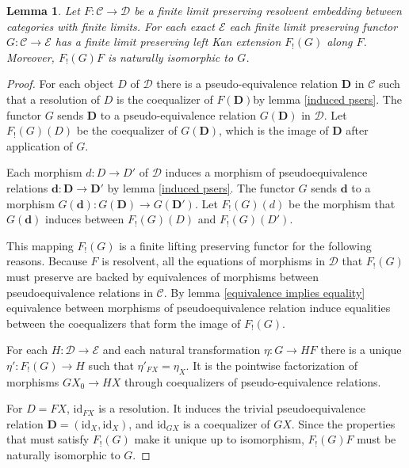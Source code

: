\documentclass[sort&compress,draft]{elsarticle}
\theoremstyle{plain}
\newtheorem{lemma}[theorem]{Lemma}
\theoremstyle{definition}
\theoremstyle{remark}
\newcommand\hide[1]{}
\newcommand\cat\mathcal
\newcommand\of:
\newcommand\id{\mathrm{id}}
\newcommand\di{_!}
\begin{document}
\begin{lemma} Let $F\of\cat C\to\cat D$ be a finite limit preserving resolvent embedding between categories with finite limits. For each exact $\cat E$ each finite limit preserving functor $G\of\cat C\to\cat E$ has a finite limit preserving left Kan extension $F\di(G)$ along $F$. Moreover, $F\di(G)F$ is naturally isomorphic to $G$.\label{resolvent to left}\end{lemma}

\hide{ It may be better to restrict this lemma to the special case where $\cat E$ is the ex/lex completion of $\cat C$. }

\newcommand\pser\mathbf
\begin{proof}
For each object $D$ of $\cat D$ there is a pseudo-equivalence relation $\pser D$ in $\cat C$ such that a resolution of $D$ is the coequalizer of $F(\pser D)$by lemma \ref{induced psers}.
The functor $G$ sends $\pser D$ to a pseudo-equivalence relation $G(\pser D)$ in $\cat D$.
Let $F\di(G)(D)$ be the coequalizer of $G(\pser D)$, which is the image of $\pser D$ after application of $G$.

Each morphism $d\of D\to D'$ of $\cat D$ induces a morphism of pseudoequivalence relations $\pser{d}:\pser{D}\to\pser{D'}$ by lemma \ref{induced psers}.
The functor $G$ sends $\pser{d}$ to a morphism $G(\pser{d})\of G(\pser D)\to G(\pser{D'})$.
Let $F\di(G)(d)$ be the morphism that $G(\pser{d})$ induces between $F\di(G)(D)$ and $F\di(G)(D')$.

This mapping $F\di(G)$ is a finite lifting preserving functor for the following reasons. Because $F$ is resolvent, all the equations of morphisms in $\cat D$ that $F\di(G)$ must preserve are backed by equivalences of morphisms between pseudoequivalence relations in $\cat C$. By lemma \ref{equivalence implies equality} equivalence between morphisms of pseudoequivalence relation induce equalities between the coequalizers that form the image of $F\di(G)$.%

For each $H\of\cat D\to\cat E$ and each natural transformation $\eta\of G \to HF$ there is a unique $\eta'\of F\di(G)\to H$ such that $\eta'_{FX}=\eta_X$. It is the pointwise factorization of morphisms $GX_0\to HX$ through coequalizers of pseudo-equivalence relations.

For $D = FX$, $\id_{FX}$ is a resolution. It induces the trivial pseudoequivalence relation $\pser D = (\id_X,\id_X)$, and $\id_{GX}$ is a coequalizer of $GX$. Since the properties that must satisfy $F\di(G)$ make it unique up to isomorphism, $F\di(G)F$ must be naturally isomorphic to $G$. 
\end{proof}
\end{document}
